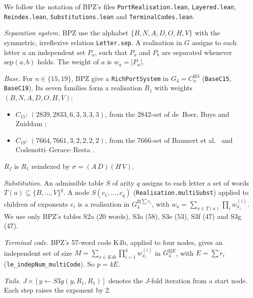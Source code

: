 \documentclass[11pt]{amsart}
\newcommand{\sbx}{\boxtimes}
\newcommand{\code}[1]{\texttt{#1}}
\begin{document}
We follow the notation of BPZ's files \code{PortRealisation.lean}, \code{Layered.lean},
\code{Reindex.lean}, \code{Substitutions.lean} and \code{TerminalCodes.lean}.

\emph{Separation system.} BPZ use the alphabet $\{B,N,A,D,O,H,V\}$ with the symmetric, irreflexive
relation \code{Letter.sep}. A realisation in $G$ assigns to each letter $a$ an independent set
$P_a$, such that $P_a$ and $P_b$ are separated whenever $\mathrm{sep}(a,b)$ holds. The weight of
$a$ is $w_a=|P_a|$.

\emph{Base.} For $n\in\{15,19\}$, BPZ give a \code{RichPortSystem} in $G_4=C_n^{\sbx4}$
(\code{BaseC15}, \code{BaseC19}). Its seven families form a realisation $R_1$ with weights
$(B,N,A,D,O,H,V)$:
\begin{itemize}
\item $C_{15}$: $(2839,2833,6,3,3,3,3)$, from the 2842-set of de~Boer, Buys and Zuiddam \cite{dBBZ};
\item $C_{19}$: $(7664,7661,3,2,2,2,2)$, from the 7666-set of Baumert et al.\ \cite{BMR} and
Codenotti--Gerace--Resta \cite{CGR}.
\end{itemize}
$R_f$ is $R_1$ reindexed by $\sigma=(A\,D)(H\,V)$.

\emph{Substitution.} An admissible table $S$ of arity $q$ assigns to each letter a set of words
$T(a)\subseteq\{B,\dots,V\}^q$. A node $S(c_1,\dots,c_q)$ (\code{Realisation.multiSubst}) applied
to children of exponents $e_i$ is a realisation in $G_4^{\sbx\sum e_i}$, with
$w_a=\sum_{x\in T(a)}\prod_i w^{(i)}_{x_i}$. We use only BPZ's tables S2a (20 words), S3a (58),
S3e (53), S3f (47) and S3g (47).

\emph{Terminal code.} BPZ's 57-word code K4b, applied to four nodes, gives an independent set of
size $M=\sum_{x\in K4b}\prod_{i=1}^4 w^{(i)}_{x_i}$ in $G_4^{\sbx E}$, with $E=\sum e_i$
(\code{le\_indepNum\_multiCode}). So $p=4E$.

\emph{Tails.} $J\times[y\leftarrow S3g(y,R_1,R_1)]$ denotes the $J$-fold iteration from a start
node. Each step raises the exponent by 2.
\end{document}
